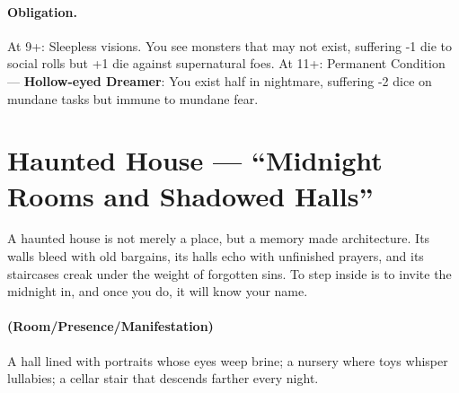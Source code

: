 \documentclass[11pt]{article}
\begin{document}
\paragraph{Obligation.}
At 9+: Sleepless visions. You see monsters that may not exist, suffering -1 die to social rolls but +1 die against supernatural foes.  
At 11+: Permanent Condition — \textbf{Hollow-eyed Dreamer}: You exist half in nightmare, suffering -2 dice on mundane tasks but immune to mundane fear.

\section{Haunted House --- ``Midnight Rooms and Shadowed Halls''}
\label{chap:haunted-house}

\begin{tcolorbox}[colback=black!3,colframe=black!40!white,title={Theme \& Atmosphere}]
A haunted house is not merely a place, but a memory made architecture. Its walls bleed with old bargains, its halls echo with unfinished prayers, and its staircases creak under the weight of forgotten sins. To step inside is to invite the midnight in, and once you do, it will know your name.
\end{tcolorbox}

\paragraph*{(Room/Presence/Manifestation)} A hall lined with portraits whose eyes weep brine; a nursery where toys whisper lullabies; a cellar stair that descends farther every night.
\end{document}
